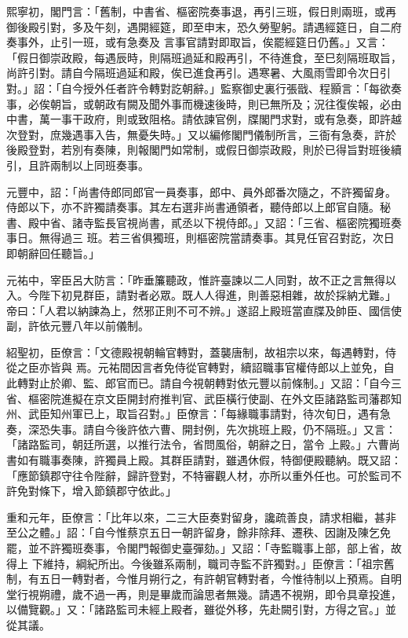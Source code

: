 \begin{pinyinscope}
 熙寧初，閣門言：「舊制，中書省、樞密院奏事退，再引三班，假日則兩班，或再御後殿引對，多及午刻，遇開經筵，即至申末，恐久勞聖躬。請遇經筵日，自二府奏事外，止引一班，或有急奏及
 言事官請對即取旨，俟罷經筵日仍舊。」又言：「假日御崇政殿，每遇辰時，則隔班過延和殿再引，不待進食，至巳刻隔班取旨，尚許引對。請自今隔班過延和殿，俟已進食再引。遇寒暑、大風雨雪即令次日引對。」詔：「自今授外任者許令轉對訖朝辭。」監察御史裏行張戩、程顥言：「每欲奏事，必俟朝旨，或朝政有闕及聞外事而機速後時，則已無所及；況往復俟報，必由中書，萬一事干政府，則或致阻格。請依諫官例，牒閣門求對，或有急奏，即許越
 次登對，庶幾遇事入告，無憂失時。」又以編修閣門儀制所言，三衙有急奏，許於後殿登對，若別有奏陳，則報閣門如常制，或假日御崇政殿，則於已得旨對班後續引，且許兩制以上同班奏事。



 元豐中，詔：「尚書侍郎同郎官一員奏事，郎中、員外郎番次隨之，不許獨留身。侍郎以下，亦不許獨請奏事。其左右選非尚書通領者，聽侍郎以上郎官自隨。秘書、殿中省、諸寺監長官視尚書，貳丞以下視侍郎。」又詔：「三省、樞密院獨班奏事日。無得過三
 班。若三省俱獨班，則樞密院當請奏事。其見任官召對訖，次日即朝辭回任聽旨。」



 元祐中，宰臣呂大防言：「昨垂簾聽政，惟許臺諫以二人同對，故不正之言無得以入。今陛下初見群臣，請對者必眾。既人人得進，則善惡相雜，故於採納尤難。」帝曰：「人君以納諫為上，然邪正則不可不辨。」遂詔上殿班當直牒及帥臣、國信使副，許依元豐八年以前儀制。



 紹聖初，臣僚言：「文德殿視朝輪官轉對，蓋襲唐制，故祖宗以來，每遇轉對，侍從之臣亦皆與
 焉。元祐間因言者免侍從官轉對，續詔職事官權侍郎以上並免，自此轉對止於卿、監、郎官而已。請自今視朝轉對依元豐以前條制。」又詔：「自今三省、樞密院進擬在京文臣開封府推判官、武臣橫行使副、在外文臣諸路監司藩郡知州、武臣知州軍已上，取旨召對。」臣僚言：「每緣職事請對，待次旬日，遇有急奏，深恐失事。請自今後許依六曹、開封例，先次挑班上殿，仍不隔班。」又言：「諸路監司，朝廷所選，以推行法令，省問風俗，朝辭之日，當令
 上殿。」六曹尚書如有職事奏陳，許獨員上殿。其群臣請對，雖遇休假，特御便殿聽納。既又詔：「應節鎮郡守往令陛辭，歸許登對，不特審觀人材，亦所以重外任也。可於監司不許免對條下，增入節鎮郡守依此。」



 重和元年，臣僚言：「比年以來，二三大臣奏對留身，讒疏善良，請求相繼，甚非至公之體。」詔：「自今惟蔡京五日一朝許留身，餘非除拜、遷秩、因謝及陳乞免罷，並不許獨班奏事，令閣門報御史臺彈劾。」又詔：「寺監職事上部，部上省，故得上
 下維持，綱紀所出。今後雖系兩制，職司寺監不許獨對。」臣僚言：「祖宗舊制，有五日一轉對者，今惟月朔行之，有許朝官轉對者，今惟待制以上預焉。自明堂行視朔禮，歲不過一再，則是畢歲而論思者無幾。請遇不視朔，即令具章投進，以備覽觀。」又：「諸路監司未經上殿者，雖從外移，先赴闕引對，方得之官。」並從其議。




\end{pinyinscope}
